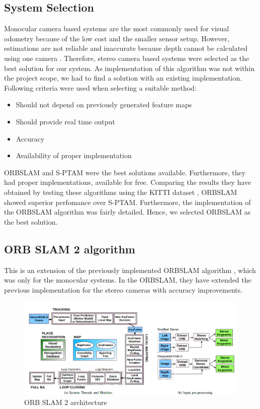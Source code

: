 \subsection{System Selection}
\label{subsec:vodomSystemSelection}
Monocular camera based systems are the most commonly used for visual odometry because of the low cost and the smaller sensor setup. However, estimations are not reliable and inaccurate because depth cannot be calculated using one camera \cite{ra:ORB_SLAM2}. Therefore, stereo camera based systems were selected as the best solution for our system. As implementation of this algorithm was not within the project scope, we had to find a solution with an existing implementation. Following criteria were used when selecting a suitable method:
\begin{itemize}
    \item Should not depend on previously generated feature maps
    \item Should provide real time output
    \item Accuracy
    \item Availability of proper implementation
\end{itemize}

\gls{ORBSLAM} \cite{ra:ORB_SLAM2} and \gls{S-PTAM} \cite{ra:S-PTAM} were the best solutions available. Furthermore, they had proper implementations, available for free. Comparing the results they have obtained by testing these algorithms using the KITTI dataset \cite{ra:KITTI}, \gls{ORBSLAM} showed superior perfomance over \gls{S-PTAM}. Furthermore, the implementation of the \gls{ORBSLAM} algorithm was fairly detailed. Hence, we selected \gls{ORBSLAM} as the best solution.


\subsection{ORB SLAM 2 algorithm}
This is an extension of the previously implemented \gls{ORBSLAM} algorithm \cite{ra:ORB_SLAM}, which was only for the monocular systems. In the \gls{ORBSLAM}, they have extended the previous implementation for the stereo cameras with accuracy improvements\cite{ra:ORB_SLAM2}. 
\begin{figure}[t]
	\centering
	\includegraphics[width=\textwidth]{figs/ORB_SYSTEM.png}
	\vspace{-0.5cm}
	\caption[ORB SLAM 2 architecture]{ORB SLAM 2 architecture \cite{ra:ORB_SLAM2}}
	\label{fig:ra:ORB_SYSTEM}
	\vspace{0.5cm}
\end{figure}


